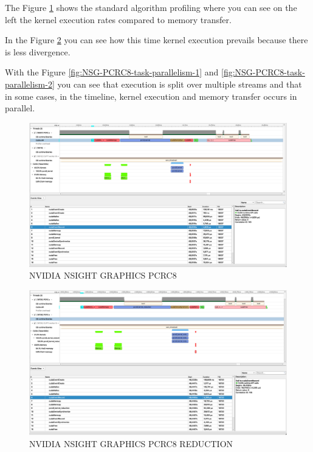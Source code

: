 \documentclass[fleqn]{IEEEtran}
\begin{document}
The Figure \ref{fig:NSG-PCRC8} shows the standard algorithm profiling where 
you can see on the left the kernel execution rates compared to memory transfer.

In the Figure \ref{fig:NSG-PCRC8-reduction} you can see how this time kernel 
execution prevails because there is less divergence. 

With the Figure \ref{fig:NSG-PCRC8-task-parallelism-1} and 
\ref{fig:NSG-PCRC8-task-parallelism-2} you can see that 
execution is split over multiple streams and that in some cases, 
in the timeline, kernel execution and memory transfer occurs in parallel.


\begin{figure}[bt]
\centering
\includegraphics[width=\textwidth]{figures/NSG-PCRC8.png}
\caption{NVIDIA NSIGHT GRAPHICS PCRC8}
\label{fig:NSG-PCRC8}
\end{figure}

\begin{figure}[bt]
\centering
\includegraphics[width=\textwidth]{figures/NSG-PCRC8-reduction.png}
\caption{NVIDIA NSIGHT GRAPHICS PCRC8 REDUCTION}
\label{fig:NSG-PCRC8-reduction}
\end{figure}
\end{document}
